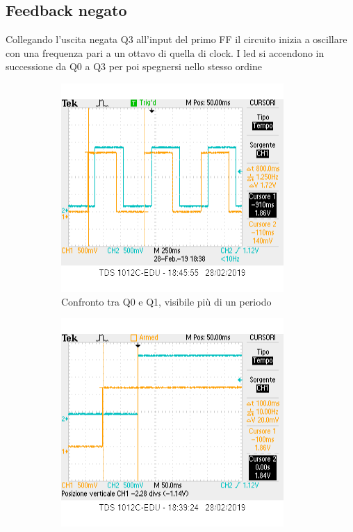 \documentclass[10pt,a4paper]{article}
\begin{document}
\subsection{Feedback negato}
Collegando l'uscita negata Q3 all'input del primo FF il circuito inizia a oscillare con una frequenza pari a un ottavo di quella di clock. I led si accendono in successione da Q0 a Q3 per poi spegnersi nello stesso ordine

\begin{figure}[h]
	\centering
	\begin{subfigure}[b]{0.4\linewidth}
		\includegraphics[width=\linewidth]{q0q1periodosr.png}
		\caption{Confronto tra Q0 e Q1, visibile più di un periodo}
	\end{subfigure}
	\begin{subfigure}[b]{0.4\linewidth}
		\includegraphics[width=\linewidth]{q0q1sr.png}

\end{subfigure}
\end{figure}
\end{document}
